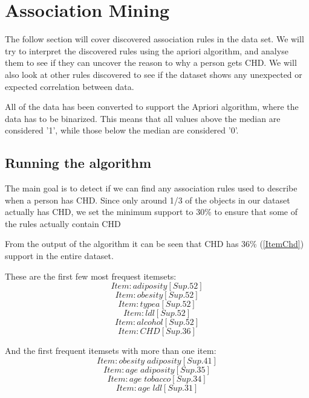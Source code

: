 \section{Association Mining}
The follow section will cover discovered association rules in the data set. We will try to interpret the discovered rules using the apriori algorithm, and analyse them to see if they can uncover the reason to why a person gets CHD. We will also look at other rules discovered to see if the dataset shows any unexpected or expected correlation between data.

All of the data has been converted to support the Apriori algorithm, where the data has to be binarized. This means that all values above the median are considered '1', while those below the median are considered '0'.

\subsection{Running the algorithm}
The main goal is to detect if we can find any association rules used to describe when a person has CHD. Since only around 1/3 of the objects in our dataset actually has CHD, we set the minimum support to 30\% to ensure that some of the rules actually contain CHD

From the output of the algorithm it can be seen that CHD has 36\% (\ref{ItemChd}) support in the entire dataset.

These are the first few most frequest itemsets:
\begin{equation}
\label{ItemAdi}
Item: adiposity[Sup. 52]
\end{equation}
\begin{equation}
\label{ItemObe}
Item: obesity[Sup. 52]
\end{equation}
\begin{equation}
\label{ItemTypea}
Item: typea[Sup. 52]
\end{equation}
\begin{equation}
\label{ItemLdl}
Item: ldl[Sup. 52]
\end{equation}
\begin{equation}
\label{ItemAlco}
Item: alcohol[Sup. 52]
\end{equation}
\begin{equation}
\label{ItemChd}
Item: CHD[Sup. 36]
\end{equation}

And the first frequent itemsets with more than one item:
\begin{equation}
\label{ItemObeAdi}
Item: obesity\;adiposity[Sup. 41]
\end{equation}
\begin{equation}
\label{ItemAgeAdi}
Item: age\;adiposity[Sup. 35]
\end{equation}
\begin{equation}
\label{ItemAgeTobacco}
Item: age\;tobacco[Sup. 34]
\end{equation}
\begin{equation}
\label{ItemAgeLdl}
Item: age\;ldl[Sup. 31]
\end{equation}



